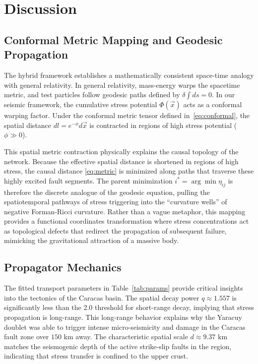 \documentclass[twocolumn,amsmath,amssymb,aps,pre,superscriptaddress]{revtex4-1}
\begin{document}
\section{Discussion}

\subsection{Conformal Metric Mapping and Geodesic Propagation}
The hybrid framework establishes a mathematically consistent space-time analogy with general relativity. In general relativity, mass-energy warps the spacetime metric, and test particles follow geodesic paths defined by $\delta \int ds = 0$. In our seismic framework, the cumulative stress potential $\Phi(\vec{x})$ acts as a conformal warping factor. Under the conformal metric tensor defined in~\eqref{eq:conformal}, the spatial distance $dl = e^{-\phi} d\vec{x}$ is contracted in regions of high stress potential ($\phi \gg 0$).

This spatial metric contraction physically explains the causal topology of the network. Because the effective spatial distance is shortened in regions of high stress, the causal distance \eqref{eq:metric} is minimized along paths that traverse these highly excited fault segments. The parent minimization $i^* = \arg\min \eta_{ij}$ is therefore the discrete analogue of the geodesic equation, pulling the spatiotemporal pathways of stress triggering into the ``curvature wells'' of negative Forman-Ricci curvature. Rather than a vague metaphor, this mapping provides a functional coordinates transformation where stress concentrations act as topological defects that redirect the propagation of subsequent failure, mimicking the gravitational attraction of a massive body.

\subsection{Propagator Mechanics}
The fitted transport parameters in Table~\ref{tab:params} provide critical insights into the tectonics of the Caracas basin. The spatial decay power $q \approx 1.557$ is significantly less than the 2.0 threshold for short-range decay, implying that stress propagation is long-range. This long-range behavior explains why the Yaracuy doublet was able to trigger intense micro-seismicity and damage in the Caracas fault zone over $150\text{ km}$ away. The characteristic spatial scale $d \approx 9.37\text{ km}$ matches the seismogenic depth of the active strike-slip faults in the region, indicating that stress transfer is confined to the upper crust.
\end{document}
